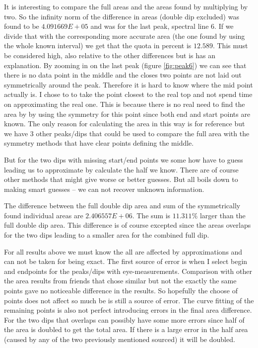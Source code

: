 \documentclass[10pt, a4paper]{article}
\begin{document}
It is interesting to compare the full areas and the areas found by multiplying by two. So the infinity norm of the difference in areas (double dip excluded) was found to be $ 4.091669E+05$ and was for the last peak, spectral line 6. If we divide that with the corresponding more accurate area (the one found by using the whole known interval) we get that the quota in percent is $12.589$. This must be considered high, also relative to the other differences but is has an explanation. By zooming in on the last peak (figure \ref{fig:peak6}) we can see that there is no data point in the middle and the closes two points are not laid out symmetrically around the peak. Therefore it is hard to know where the mid point actually is. I chose to to take the point closest to the real top and not spend time on approximating the real one. This is because there is no real need to find the area by by using the symmetry for this point since both end and start points are known. The only reason for calculating the area in this way is for reference but we have 3 other peaks/dips that could be used to compare the full area with the symmetry methods that have clear points defining the middle.

But for the two dips with missing start/end points we some how have to guess leading us to approximate by calculate the half we know. There are of course other methods that might give worse or better guesses. But all boils down to making smart guesses -- we can not recover unknown information.

The difference between the full double dip area and sum of the symmetrically found individual areas are $2.406557E+06$. The sum is $11.311\%$ larger than the full double dip area. This difference is of course excepted since the areas overlaps for the two dips leading to a smaller area for the combined full dip.

For all results above we must know the all are affected by approximations and can not be taken for being exact. The first source of error is when I select begin and endpoints for the peaks/dips with eye-measurements. Comparison with other the area results from friends that chose similar but not the exactly the same points gave no noticeable difference in the results. So hopefully the choose of points does not affect so much be is still a source of error. The curve fitting of the remaining points is also not perfect introducing errors in the final area difference. For the two dips that overlaps can possibly have some more errors since half of the area is doubled to get the total area. If there is a large error in the half area (caused by any of the two previously mentioned sourced) it will be doubled.
\end{document}
